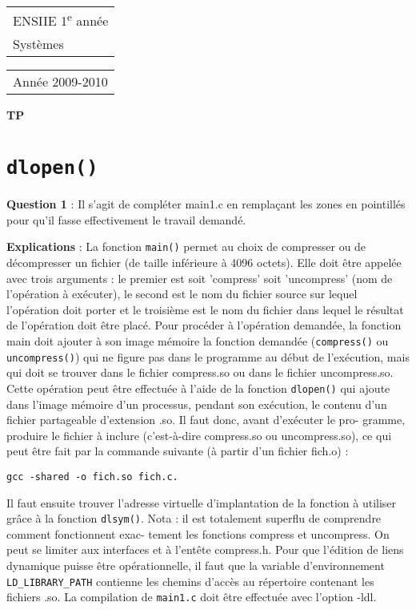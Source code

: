 \documentclass[a4paper,12pt]{article}
\begin{document}
{\large\sffamily
\begin{tabular}[t]{l}
  ENSIIE 1\textsuperscript{e} année\\
  Systèmes
\end{tabular}%
\hfill%
\begin{tabular}[t]{r}
  Année 2009-2010
\end{tabular}}

\vspace{2em}
\begin{center}
  \Large\bfseries\sffamily TP 
\end{center}
\vspace{1em}


\section{\texttt{dlopen()}}

\textbf{Question 1} : Il s'agit de compléter main1.c en remplaçant les zones en pointillés 
pour qu'il fasse effectivement le travail demandé.

\textbf{Explications} : La fonction \texttt{main()} permet au choix de compresser ou de
décompresser un fichier (de taille inférieure à 4096 octets).
Elle doit être appelée avec trois arguments : le premier est soit 'compress'
soit 'uncompress' (nom de l'opération à exécuter), le second est le nom du fichier
source sur lequel l'opération doit porter et le troisième est le nom du fichier
dans lequel le résultat de l'opération doit être placé.
Pour procéder à l'opération demandée, la fonction main doit ajouter à son
image mémoire la fonction demandée (\texttt{compress()} ou \texttt{uncompress()}) qui ne
figure pas dans le programme au début de l'exécution, mais qui doit se trouver
dans le fichier compress.so ou dans le fichier uncompress.so.
Cette opération peut être effectuée à l'aide de la fonction \texttt{dlopen()} qui
ajoute dans l'image mémoire d'un processus, pendant son exécution, le contenu
d'un fichier partageable d'extension .so. Il faut donc, avant d'exécuter le pro-
gramme, produire le fichier à inclure (c'est-à-dire compress.so ou uncompress.so),
ce qui peut être fait par la commande suivante (à partir d'un fichier fich.o) :
\begin{verbatim}
gcc -shared -o fich.so fich.c.
\end{verbatim}
Il faut ensuite trouver l'adresse virtuelle d'implantation de la fonction à
utiliser grâce à la fonction \texttt{dlsym()}.
Nota : il est totalement superflu de comprendre comment fonctionnent exac-
tement les fonctions compress et uncompress. On peut se limiter aux interfaces
et à l'entête compress.h.
Pour que l'édition de liens dynamique puisse être opérationnelle, il faut que
la variable d'environnement \verb#LD_LIBRARY_PATH# contienne les chemins d'accès
au répertoire contenant les fichiers .so. La compilation de \texttt{main1.c} doit être
effectuée avec l'option -ldl.
\end{document}
